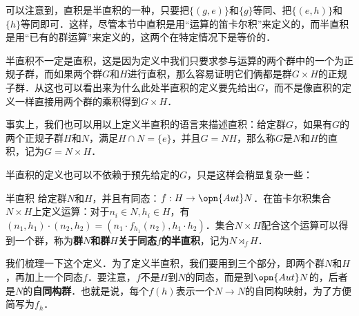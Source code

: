 可以注意到，直积是半直积的一种，只要把$\{(g, e)\}$和$\{g\}$等同、把$\{(e, h)\}$和$\{h\}$等同即可．这样，尽管本节中直积是用“运算的笛卡尔积”来定义的，而半直积是用“已有的群运算”来定义的，这两个在特定情况下是等价的．

半直积不一定是直积，这是因为定义中我们只要求参与运算的两个群中的一个为正规子群，而如果两个群$G$和$H$进行直积，那么容易证明它们俩都是群$G\times H$的正规子群．从这也可以看出来为什么此处半直积的定义要先给出$G$，而不是像直积的定义一样直接用两个群的乘积得到$G\times H$．

事实上，我们也可以用以上定义半直积的语言来描述直积：给定群$G$，如果有$G$的两个正规子群$H$和$N$，满足$H\cap N=\{e\}$，并且$G=NH$，那么称$G$是$N$和$H$的直积，记为$G=N\times H$．

半直积的定义也可以不依赖于预先给定的$G$，只是这样会稍显复杂一些：

\begin{definition}{半直积}
给定群$N$和$H$，并且有同态：$f:H\rightarrow \opn{Aut}N$．在笛卡尔积集合$N\times H$上定义运算：对于$n_i\in N, h_i\in H$，有$(n_1, h_1)\cdot(n_2, h_2)=(n_1\cdot f_{h_1}(n_2), h_1\cdot h_2)$．集合$N\times H$配合这个运算可以得到一个群，称为\textbf{群}$N$\textbf{和群}$H$\textbf{关于同态}$f$\textbf{的半直积}，记为$N\rtimes_fH$．
\end{definition}

我们梳理一下这个定义．为了定义半直积，我们要用到三个部分，即两个群$N$和$H$，再加上一个同态$f$．要注意，$f$不是$H$到$N$的同态，而是到$\opn{Aut} N$的，后者是$N$的\textbf{自同构群}．也就是说，每个$f(h)$表示一个$N\rightarrow N$的自同构映射，为了方便简写为$f_h$．














